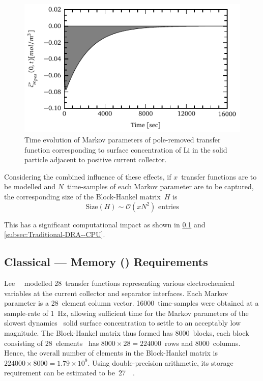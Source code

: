 \begin{figure}[!htbp]
    \centering
    \includegraphics{markov_decay.pdf}
    \caption[Markov parameters of solid surface concentration at positive
    current collector]{Time evolution of Markov parameters of pole-removed transfer
        function corresponding to surface concentration of Li in the solid particle
    adjacent to positive current collector.}
    \label{fig:markov_cse_pos}
\end{figure}

Considering the combined  influence of these effects,  if $x$~transfer functions
are  to be  modelled and  $N$~time-samples of  each Markov  parameter are  to be
captured, the corresponding size of the Block-Hankel matrix~$H$ is
\begin{equation}
    \text{Size}(H)\sim \mathcal{O}(x N^2)\text{ entries}
\end{equation}

This    has    a    significant     computational    impact    as    shown    in
\cref{subsec:Traditional-DRA--Memory} and \cref{subsec:Traditional-DRA--CPU}.

\subsection{Classical  --- Memory () Requirements}\label{subsec:Traditional-DRA--Memory}

Lee~\etal~\cite{Lee2012a}  modelled 28~transfer  functions representing  various
electrochemical  variables at  the current  collector and  separator interfaces.
Each Markov  parameter is  a 28~element  column vector.  16000~time-samples were
obtained at  a sample-rate of  \SI{1}{\hertz}, allowing sufficient time  for the
Markov parameters  of the  slowest dynamics  \ie~solid surface  concentration to
settle  to an  acceptably low  magnitude.  The Block-Hankel  matrix thus  formed
has  8000~blocks, each  block  consisting of  28~elements  \ie~has $8000  \times
28=224000$~rows  and 8000~columns.  Hence,  the overall  number  of elements  in
the  Block-Hankel matrix  is~${224000  \times 8000=1.79  \times 10^{9}}$.  Using
double-precision  arithmetic,  its  storage  requirement  can  be  estimated  to
be~\approx\SI{27}{\giga\byte}.

